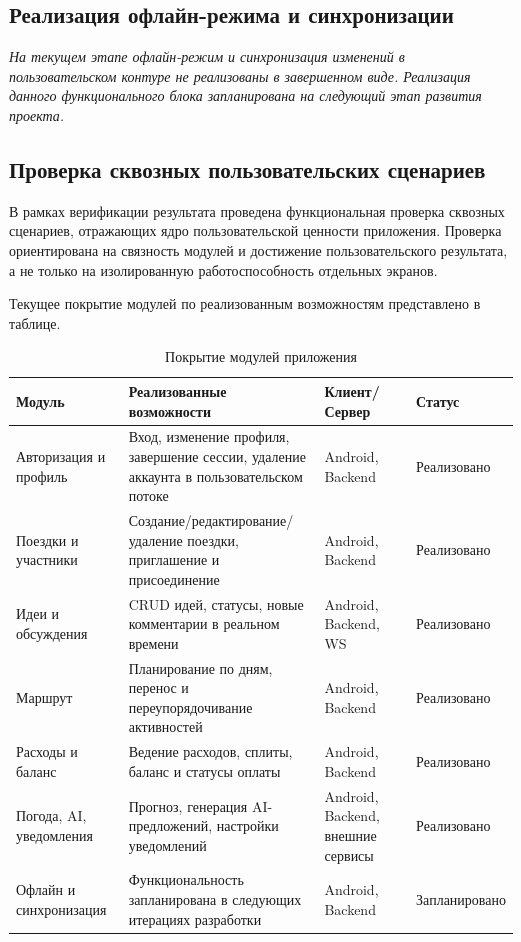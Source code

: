 \subsection{Реализация офлайн-режима и синхронизации}
\textit{На текущем этапе офлайн-режим и синхронизация изменений в пользовательском контуре не реализованы в завершенном виде. Реализация данного функционального блока запланирована на следующий этап развития проекта.}

\subsection{Проверка сквозных пользовательских сценариев}

В рамках верификации результата проведена функциональная проверка сквозных сценариев, отражающих ядро пользовательской ценности приложения. Проверка ориентирована на связность модулей и достижение пользовательского результата, а не только на изолированную работоспособность отдельных экранов.

Текущее покрытие модулей по реализованным возможностям представлено в таблице.

\begin{table}[H]
\centering
\small
\caption{Покрытие модулей приложения}
\begin{tabular}{|p{2.8cm}|p{5.4cm}|p{2.8cm}|p{1.9cm}|}
\hline
Модуль & Реализованные возможности & Клиент/Сервер & Статус \\ 
\hline
Авторизация и профиль & Вход, изменение профиля, завершение сессии, удаление аккаунта в пользовательском потоке & Android, Backend & Реализовано \\ 
\hline
Поездки и участники & Создание/редактирование/удаление поездки, приглашение и присоединение & Android, Backend & Реализовано \\ 
\hline
Идеи и обсуждения & CRUD идей, статусы, новые комментарии в реальном времени & Android, Backend, WS & Реализовано \\ 
\hline
Маршрут & Планирование по дням, перенос и переупорядочивание активностей & Android, Backend & Реализовано \\ 
\hline
Расходы и баланс & Ведение расходов, сплиты, баланс и статусы оплаты & Android, Backend & Реализовано \\ 
\hline
Погода, AI, уведомления & Прогноз, генерация AI-предложений, настройки уведомлений & Android, Backend, внешние сервисы & Реализовано \\ 
\hline
Офлайн и синхронизация & Функциональность запланирована в следующих итерациях разработки & Android, Backend & Запланировано \\ 
\hline
\end{tabular}
\end{table}

